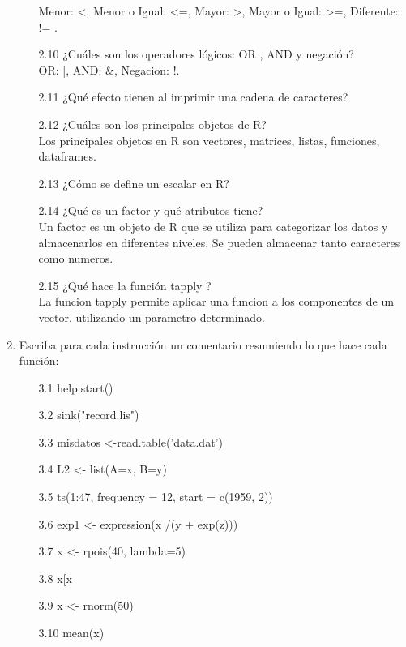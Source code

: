 \documentclass[letterpaper, 12pt]{article}
\begin{document}
\begin{enumerate}
\begin{enumerate}
Menor: <, Menor o Igual: <=, Mayor: >, Mayor o Igual: >=, Diferente: != . 
\item[2.10] ¿Cuáles son los operadores lógicos: OR , AND y negación?\\
OR: |, AND: \&, Negacion: !.
\item[2.11] ¿Qué efecto tienen  al imprimir una cadena de caracteres?
\item[2.12] ¿Cuáles son los principales objetos de R?\\
Los principales objetos en R son vectores, matrices, listas, funciones, dataframes.
\item[2.13] ¿Cómo se define un escalar en R?\\
\item[2.14] ¿Qué es un factor y qué atributos tiene?\\
Un factor es un objeto de R que se utiliza para categorizar los datos y almacenarlos en diferentes niveles. Se pueden almacenar tanto caracteres como numeros.
\item[2.15] ¿Qué hace la función tapply ?\\
La funcion tapply permite aplicar una funcion a los componentes de un vector, utilizando un parametro determinado. 
\end{enumerate}

\item Escriba para cada instrucción un comentario resumiendo lo que hace
cada función:
\begin{enumerate}
\item[3.1] help.start()
\item[3.2] sink("record.lis")
\item[3.3] misdatos <-read.table('data.dat')
\item[3.4] L2 <- list(A=x, B=y)
\item[3.5] ts(1:47, frequency = 12, start = c(1959, 2))
\item[3.6] exp1 <- expression(x /(y + exp(z)))
\item[3.7] x <- rpois(40, lambda=5)
\item[3.8] x[x %
\item[3.9] x <- rnorm(50)
\item[3.10] mean(x)
\end{enumerate}


\end{enumerate}
\end{document}
